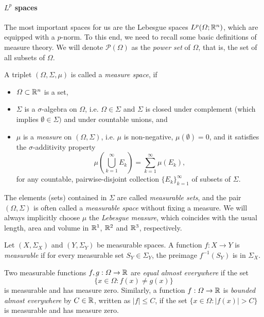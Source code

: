 \paragraph{\texorpdfstring{$L^p$ spaces}{Lp spaces}}
The most important spaces for us are the Lebesgue spaces $L^p(\Omega;\mathbb{R}^n)$, which are equipped with a $p$-norm. To this end, we need to recall some basic definitions of measure theory. We will denote $\mathcal{P}(\Omega)$ as the \emph{power set} of $\Omega$, that is, the set of all subsets of $\Omega$. 
\begin{definition}
    A triplet $(\Omega, \Sigma, \mu)$ is called a \emph{measure space}, if 
    \begin{itemize}
        \item $\Omega\subset\mathbb{R}^n$ is a set,
        \item $\Sigma$ is a $\sigma$-algebra on $\Omega$, i.e. $\Omega\in\Sigma$ and  $\Sigma$ is closed under complement (which implies $\emptyset\in\Sigma)$ and under countable unions, and
        \item $\mu$ is a \emph{measure} on $(\Omega,\Sigma)$, i.e. $\mu$ is non-negative, $\mu(\emptyset) = 0$, and it satisfies the $\sigma$-additivity property
        \begin{equation*}
            \mu\left(\bigcup_{k=1}^\infty E_k\right) = \sum_{k=1}^\infty \mu(E_k),
        \end{equation*}
        for any countable, pairwise-disjoint collection $\{E_k\}_{k=1}^\infty$ of subsets of $\Sigma$.
    \end{itemize}
    The elements (sets) contained in $\Sigma$ are called \emph{measurable sets}, and the pair $(\Omega,\Sigma)$ is often called a \emph{measurable space} without fixing a measure. We will always implicitly choose $\mu$ the \emph{Lebesgue measure}, which coincides with the usual length, area and volume in $\mathbb{R}^1$, $\mathbb{R}^2$ and $\mathbb{R}^3$, respectively. 
\end{definition}
\begin{definition}
    Let $(X,\Sigma_X)$ and $(Y, \Sigma_Y)$ be measurable spaces. A function $f:X\to Y$ is \emph{measurable} if for every measurable set $S_Y\in\Sigma_Y$, the preimage $f^{-1}(S_Y)$ is in $\Sigma_X$. 
    
    Two measurable functions $f,g:\Omega\to\mathbb{R}$ are \emph{equal almost everywhere} if the set 
    \begin{equation*}
        \{x\in \Omega: f(x)\neq g(x)\}
    \end{equation*}
    is measurable and has measure zero. Similarly, a function $f:\Omega\to \mathbb{R}$ is \emph{bounded almost everywhere} by $C\in\mathbb{R}$, written as $|f|\leq C$, if the set $\{x\in\Omega: |f(x)|>C\}$ is measurable and has measure zero.
\end{definition}
